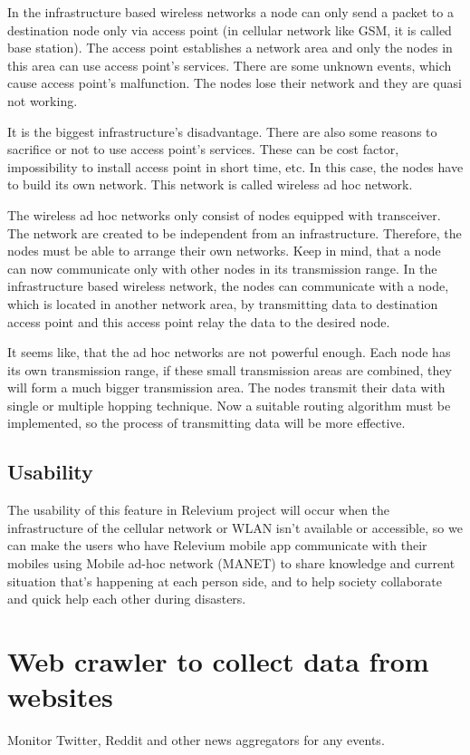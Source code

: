 \documentclass{scrreprt}
\begin{document}
In the infrastructure based wireless networks a node can only send a packet to a destination node only via access point (in cellular network like GSM, it is called
base station). The access point establishes a network area and
only the nodes in this area can use access point’s services.
There are some unknown events, which cause access point’s
malfunction. The nodes lose their network and they are quasi
not working.

It is the biggest infrastructure’s disadvantage.
There are also some reasons to sacrifice or not to use access
point’s services. These can be cost factor, impossibility to
install access point in short time, etc. In this case, the nodes
have to build its own network. This network is called wireless
ad hoc network.

The wireless ad hoc networks only consist of nodes
equipped with transceiver. The network are created to be
independent from an infrastructure. Therefore, the nodes must
be able to arrange their own networks. Keep in mind, that
a node can now communicate only with other nodes in
its transmission range. In the infrastructure based wireless
network, the nodes can communicate with a node, which
is located in another network area, by transmitting data to
destination access point and this access point relay the data to
the desired node.

It seems like, that the ad hoc networks are not powerful
enough. Each node has its own transmission range, if these
small transmission areas are combined, they will form a much
bigger transmission area. The nodes transmit their data with
single or multiple hopping technique. Now a suitable routing
algorithm must be implemented, so the process of transmitting
data will be more effective.

\subsection{Usability}

The usability of this feature in Relevium project will occur when the infrastructure of the cellular network or WLAN isn’t available or accessible, so we can make the users who have Relevium mobile app communicate with their mobiles using Mobile ad-hoc network (MANET) to share knowledge and current situation that’s happening at each person side, and to help society collaborate and quick help each other during disasters.



\newpage
\section{Web crawler to collect data from websites}
Monitor Twitter, Reddit and other news aggregators for any events.
\end{document}
